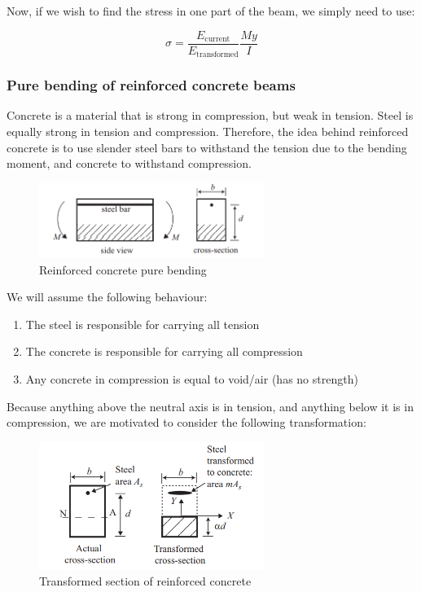 \documentclass{article}
\begin{document}
Now, if we wish to find the stress in one part of the beam, we simply need to use:

\[ \sigma = \frac{E_\text{current}}{E_\text{transformed}}\frac{My}{I} \]

\subsubsection{Pure bending of reinforced concrete beams}

Concrete is a material that is strong in compression, but weak in tension. Steel is equally strong in tension and compression. Therefore, the idea behind reinforced concrete is to use slender steel bars to withstand the tension due to the bending moment, and concrete to withstand compression.

\begin{figure}[h]
    \centering
    \includegraphics[width = 0.65\textwidth]{images/concrete.png}
    \caption{Reinforced concrete pure bending}
    \label{fig:enter-label}
\end{figure}

We will assume the following behaviour:

\begin{enumerate}
    \item The steel is responsible for carrying all tension
    \item The concrete is responsible for carrying all compression
    \item Any concrete in compression is equal to void/air (has no strength)
\end{enumerate}

Because anything above the neutral axis is in tension, and anything below it is in compression, we are motivated to consider the following transformation:

\begin{figure}[h]
    \centering
    \includegraphics[width = 0.65\textwidth]{images/transform.png}
    \caption{Transformed section of reinforced concrete}
    \label{fig:enter-label}
\end{figure}
\end{document}
